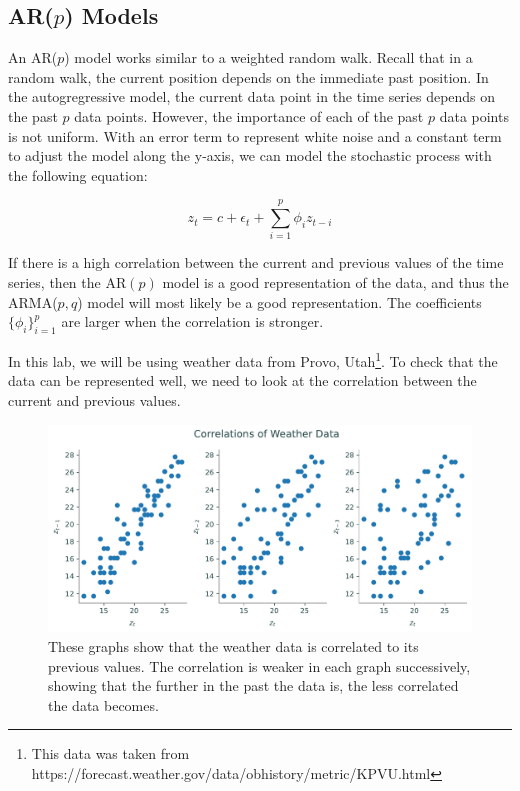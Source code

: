 \subsection*{AR($p$) Models}

An AR($p$) model works similar to a weighted random walk.
Recall that in a random walk, the current position depends on the immediate past position.
In the autogregressive model, the current data point in the time series depends on the past $p$ data points.
However, the importance of each of the past $p$ data points is not uniform.
With an error term to represent white noise and a constant term to adjust the model along the y-axis, we can model the stochastic process with the following equation:

\begin{equation}
z_t=c + \epsilon_t + \sum_{i=1}^p\phi_i z_{t-i}
\label{eq:AR}
\end{equation}

If there is a high correlation between the current and previous values of the time series, then the AR$(p)$ model is a good representation of the data, and thus the ARMA($p,q$) model will most likely be a good representation.
The coefficients $\{\phi_i\}_{i=1}^p$ are larger when the correlation is stronger.

In this lab, we will be using weather data from Provo, Utah\footnote{This data was taken from https://forecast.weather.gov/data/obhistory/metric/KPVU.html}.
To check that the data can be represented well, we need to look at the correlation between the current and previous values.

\begin{figure}[H]
\centering
\includegraphics[width=\textwidth]{figures/correlations.pdf}
\caption{These graphs show that the weather data is correlated to its previous values.
The correlation is weaker in each graph successively, showing that the further in the past the data is, the less correlated the data becomes.}
\label{fig:correlations}
\end{figure}

